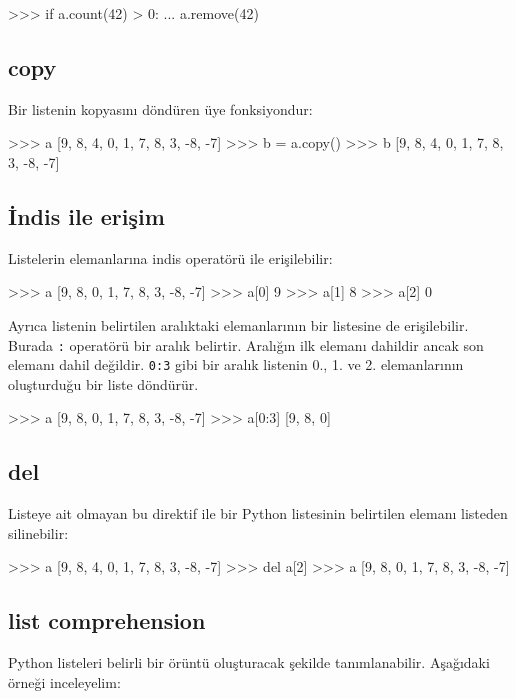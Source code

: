\documentclass[12pt]{report}
\begin{document}
\begin{python}
>>> if a.count(42) > 0:
...     a.remove(42)
\end{python}


\subsection{copy}
Bir listenin kopyasını döndüren üye fonksiyondur:

\begin{python}
>>> a
[9, 8, 4, 0, 1, 7, 8, 3, -8, -7]
>>> b = a.copy()
>>> b
[9, 8, 4, 0, 1, 7, 8, 3, -8, -7]
\end{python}

\subsection{İndis ile erişim}
Listelerin elemanlarına indis operatörü ile erişilebilir:

\begin{python}
>>> a
[9, 8, 0, 1, 7, 8, 3, -8, -7]
>>> a[0]
9
>>> a[1]
8
>>> a[2]
0
\end{python}


Ayrıca listenin belirtilen aralıktaki elemanlarının bir listesine de erişilebilir. Burada \texttt{:} operatörü bir aralık belirtir. Aralığın ilk elemanı dahildir ancak son elemanı dahil değildir. \texttt{0:3} gibi bir aralık listenin 0., 1. ve 2. elemanlarının oluşturduğu bir liste döndürür.

\begin{python}
>>> a
[9, 8, 0, 1, 7, 8, 3, -8, -7]
>>> a[0:3]
[9, 8, 0]
\end{python}

\subsection{del}
Listeye ait olmayan bu direktif ile bir Python listesinin belirtilen elemanı listeden silinebilir:
\begin{python}
>>> a
[9, 8, 4, 0, 1, 7, 8, 3, -8, -7]
>>> del a[2]
>>> a
[9, 8, 0, 1, 7, 8, 3, -8, -7]
\end{python}

\subsection{list comprehension}
Python listeleri belirli bir örüntü oluşturacak şekilde tanımlanabilir. Aşağıdaki örneği inceleyelim:
\end{document}
